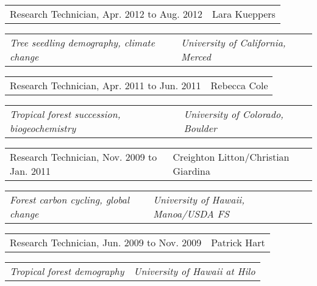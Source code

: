 \documentclass[11pt,english]{article}
\providecommand{\tabularnewline}{\\}
\begin{document}
\begin{tabular}{>{\raggedright}p{3.25in}>{\raggedleft}p{2.75in}}
Research Technician, Apr. 2012 to Aug. 2012 & Lara Kueppers \tabularnewline
\end{tabular}

\begin{tabular}{>{\raggedright}p{3.25in}>{\raggedleft}p{2.75in}}
\hspace{1.5em}\emph{Tree seedling demography, climate change} & \emph{University of California, Merced} %
\end{tabular}
\vspace{-2ex}

\begin{tabular}{>{\raggedright}p{3.25in}>{\raggedleft}p{2.75in}}
Research Technician, Apr. 2011 to Jun. 2011 & Rebecca Cole\tabularnewline
\end{tabular}

\begin{tabular}{>{\raggedright}p{3.25in}>{\raggedleft}p{=2.75in}}
\hspace{1.5em}\emph{Tropical forest succession, biogeochemistry} & \emph{University of Colorado, Boulder}\tabularnewline
\end{tabular}
\vspace{-2ex}

\begin{tabular}{>{\raggedright}p{3.25in}>{\raggedleft}p{2.75in}}
Research Technician, Nov. 2009 to Jan. 2011 & Creighton Litton/Christian Giardina\tabularnewline
\end{tabular}

\begin{tabular}{>{\raggedright}p{3.25in}>{\raggedleft}p{2.75in}}
\hspace{1.5em}\emph{Forest carbon cycling, global change} & \emph{University of Hawaii, Manoa/USDA FS}\tabularnewline
\end{tabular}
\vspace{-2ex}

\begin{tabular}{>{\raggedright}p{3.25in}>{\raggedleft}p{2.75in}}
Research Technician, Jun. 2009 to Nov. 2009 & Patrick Hart\tabularnewline
\end{tabular}

\begin{tabular}{>{\raggedright}p{3.25in}>{\raggedleft}p{2.75in}}
\hspace{1.5em}\emph{Tropical forest demography} & \emph{University of Hawaii at Hilo}\tabularnewline
\end{tabular}
\vspace{-2ex}
\end{document}
